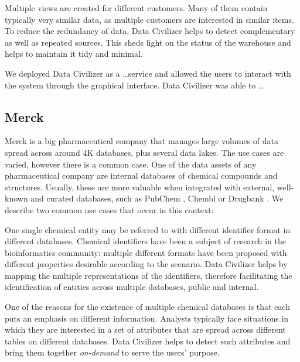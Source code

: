  Multiple views are created for different customers.
Many of them contain typically very similar data, as multiple customers are
interested in similar items. To reduce the redundancy of data, Data Civilizer
helps to detect complementary as well as repeated sources. This sheds light on
the status of the warehouse and helps to maintain it tidy and minimal.

We deployed Data Civilizer as a \ldots service and allowed the users to interact
with the system through the graphical interface. Data Civilizer was able to
\ldots

\subsection{Merck}

Merck is a big pharmaceutical company that manages large volumes of data spread
across around 4K databases, plus several data lakes. The use cases are varied,
however there is a common case. One of the data assets of any pharmaceutical
company are internal databases of chemical compounds and structures. Usually,
these are more valuable when integrated with external, well-known and curated
databases, such as PubChem \cite{pubchem}, Chembl \cite{chembl} or Drugbank
\cite{drugbank}. We describe two common use cases that occur in this context:

 One single chemical entity may be referred to with
different identifier format in different databases. Chemical identifiers have
been a subject of research in the bioinformatics community: multiple different
formats have been proposed with different properties desirable according to the
scenario. Data Civilizer helps by mapping the multiple representations of the
identifiers, therefore facilitating the identification of entities across
multiple databases, public and internal.

 One of the reasons for the existence of multiple chemical
databases is that each puts an emphasis on different information. Analysts
typically face situations in which they are interested in a set of attributes
that are spread across different tables on different databases. Data Civilizer
helps to detect such attributes and bring them together \emph{on-demand} to
serve the users' purpose. 
